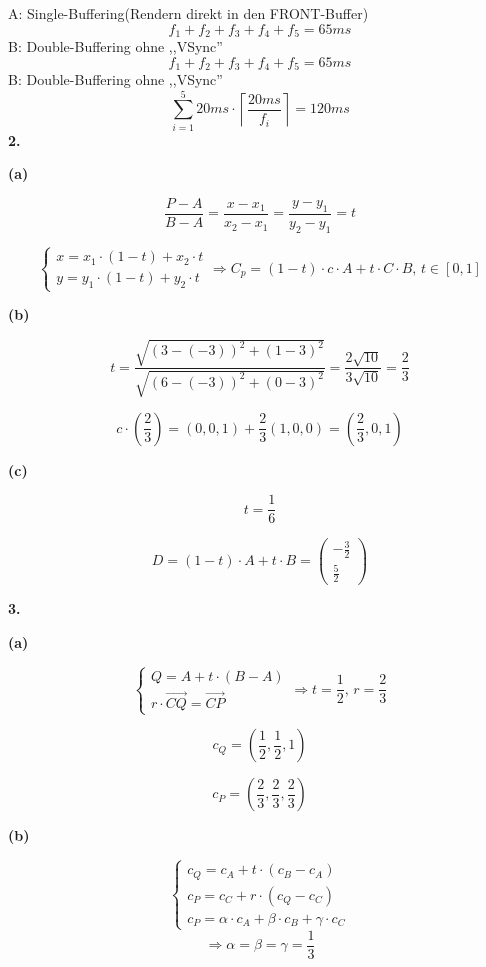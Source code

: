 \documentclass[fleqn]{article}
\begin{document}
\indent\indent\indent A: Single-Buffering(Rendern direkt in den FRONT-Buffer)
$$f_1+f_2+f_3+f_4+f_5=65ms$$
\indent\indent\indent B: Double-Buffering ohne ,,VSync''
$$f_1+f_2+f_3+f_4+f_5=65ms$$
\indent\indent\indent B: Double-Buffering ohne ,,VSync''
$$\sum^5_{i=1}20ms\cdot \left\lceil\frac{20ms}{f_i}\right\rceil=120ms$$
\indent\textbf{2.}

\indent\indent\textbf{(a)}

$$\frac{P-A}{B-A}=\frac{x-x_1}{x_2-x_1}=\frac{y-y_1}{y_2-y_1}=t$$

$$\left\{
    \begin{aligned}
        x=x_1\cdot(1-t)+x_2\cdot t\\
        y=y_1\cdot(1-t)+y_2\cdot t
    \end{aligned}    
\right.\Rightarrow C_p=(1-t)\cdot c\cdot A +t\cdot C\cdot B,\,t\in[0,1]$$

\indent\indent\textbf{(b)}

$$t=\frac{\sqrt{(3-(-3))^2+(1-3)^2}}{\sqrt{(6-(-3))^2+(0-3)^2}}=\frac{2\sqrt{10}}{3\sqrt{10}}=\frac{2}{3}$$

$$c\cdot(\frac{2}{3})=(0,0,1)+\frac{2}{3}(1,0,0)=(\frac{2}{3},0,1)$$

\indent\indent\textbf{(c)}

$$t=\frac{1}{6}$$

$$D=(1-t)\cdot A + t\cdot B = \begin{pmatrix}
    -\frac{3}{2}\\\frac{5}{2}
\end{pmatrix}$$

\indent\textbf{3.}

\indent\indent\textbf{(a)}

$$\left\{
    \begin{aligned}
        Q=A+t\cdot(B-A)\\
        r\cdot\overrightarrow{CQ}=\overrightarrow{CP}
    \end{aligned}
\right.\Rightarrow t=\frac{1}{2},\,r=\frac{2}{3}$$

$$c_Q=(\frac{1}{2},\frac{1}{2},1)$$

$$c_P=(\frac{2}{3},\frac{2}{3},\frac{2}{3})$$

\indent\indent\textbf{(b)}

$$\left\{\begin{aligned}
    c_Q=c_A+t\cdot(c_B-c_A)\\
    c_P=c_C+r\cdot(c_Q-c_C)\\
    c_P=\alpha\cdot c_A+\beta\cdot c_B+\gamma\cdot c_C
\end{aligned}\right.$$
$$\Rightarrow \alpha=\beta=\gamma=\frac{1}{3}$$
\end{document}
